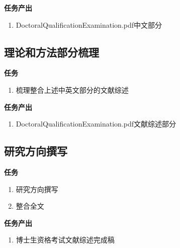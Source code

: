 \documentclass[
  12pt,
]{ctexart}
\providecommand{\tightlist}{%
  \setlength{\itemsep}{0pt}\setlength{\parskip}{0pt}}
\begin{document}
\textbf{任务产出}

\begin{enumerate}
\def\labelenumi{\arabic{enumi}.}
\tightlist
\item
  DoctoralQualificationExamination.pdf中文部分
\end{enumerate}

\hypertarget{ux7406ux8bbaux548cux65b9ux6cd5ux90e8ux5206ux68b3ux7406}{%
\subsection{理论和方法部分梳理}\label{ux7406ux8bbaux548cux65b9ux6cd5ux90e8ux5206ux68b3ux7406}}

\textbf{任务}

\begin{enumerate}
\def\labelenumi{\arabic{enumi}.}
\tightlist
\item
  梳理整合上述中英文部分的文献综述
\end{enumerate}

\textbf{任务产出}

\begin{enumerate}
\def\labelenumi{\arabic{enumi}.}
\tightlist
\item
  DoctoralQualificationExamination.pdf文献综述部分
\end{enumerate}

\hypertarget{ux7814ux7a76ux65b9ux5411ux64b0ux5199}{%
\subsection{研究方向撰写}\label{ux7814ux7a76ux65b9ux5411ux64b0ux5199}}

\textbf{任务}

\begin{enumerate}
\def\labelenumi{\arabic{enumi}.}
\item
  研究方向撰写
\item
  整合全文
\end{enumerate}

\textbf{任务产出}

\begin{enumerate}
\def\labelenumi{\arabic{enumi}.}
\tightlist
\item
  博士生资格考试文献综述完成稿
\end{enumerate}
\end{document}
